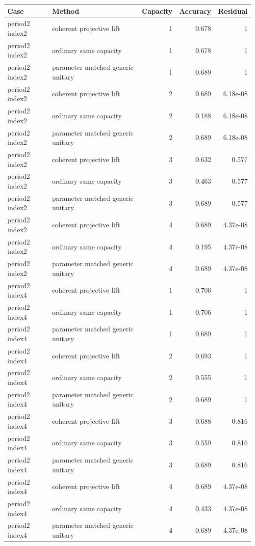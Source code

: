 \begin{tabular}{llrrr}
\toprule
Case & Method & Capacity & Accuracy & Residual\\
\midrule
period2 index2 & coherent projective lift & 1 & 0.678 & 1\\
period2 index2 & ordinary same capacity & 1 & 0.678 & 1\\
period2 index2 & parameter matched generic unitary & 1 & 0.689 & 1\\
period2 index2 & coherent projective lift & 2 & 0.689 & 6.18e-08\\
period2 index2 & ordinary same capacity & 2 & 0.188 & 6.18e-08\\
period2 index2 & parameter matched generic unitary & 2 & 0.689 & 6.18e-08\\
period2 index2 & coherent projective lift & 3 & 0.632 & 0.577\\
period2 index2 & ordinary same capacity & 3 & 0.463 & 0.577\\
period2 index2 & parameter matched generic unitary & 3 & 0.689 & 0.577\\
period2 index2 & coherent projective lift & 4 & 0.689 & 4.37e-08\\
period2 index2 & ordinary same capacity & 4 & 0.195 & 4.37e-08\\
period2 index2 & parameter matched generic unitary & 4 & 0.689 & 4.37e-08\\
period2 index4 & coherent projective lift & 1 & 0.706 & 1\\
period2 index4 & ordinary same capacity & 1 & 0.706 & 1\\
period2 index4 & parameter matched generic unitary & 1 & 0.689 & 1\\
period2 index4 & coherent projective lift & 2 & 0.693 & 1\\
period2 index4 & ordinary same capacity & 2 & 0.555 & 1\\
period2 index4 & parameter matched generic unitary & 2 & 0.689 & 1\\
period2 index4 & coherent projective lift & 3 & 0.688 & 0.816\\
period2 index4 & ordinary same capacity & 3 & 0.559 & 0.816\\
period2 index4 & parameter matched generic unitary & 3 & 0.689 & 0.816\\
period2 index4 & coherent projective lift & 4 & 0.689 & 4.37e-08\\
period2 index4 & ordinary same capacity & 4 & 0.433 & 4.37e-08\\
period2 index4 & parameter matched generic unitary & 4 & 0.689 & 4.37e-08\\

\end{tabular}
